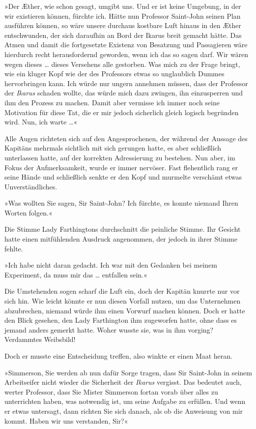 »Der Æther, wie schon gesagt, umgibt uns. Und er ist keine
Umgebung, in der wir existieren können, fürchte ich. Hätte nun
Professor Saint-John seinen Plan ausführen können, so wäre unsere
durchaus kostbare Luft hinaus in den Æther entschwunden, der sich
daraufhin an Bord der Ikarus breit gemacht hätte. Das Atmen und
damit die fortgesetzte Existenz von Besatzung und Passagieren wäre
hierdurch recht herausfordernd geworden, wenn ich das so sagen
darf. Wir wären wegen dieses \ldots{} dieses Versehens alle gestorben.
Was mich zu der Frage bringt, wie ein kluger Kopf wie der des
Professors etwas so unglaublich Dummes hervorbringen kann. Ich
würde nur ungern annehmen müssen, dass der Professor der
\emph{Ikarus} schaden wollte, das würde mich dazu zwingen, ihn
einzusperren und ihm den Prozess zu machen. Damit aber vermisse ich
immer noch seine Motivation für diese Tat, die er mir jedoch
sicherlich gleich logisch begründen wird. Nun, ich warte \ldots{}«

\bigpar

Alle Augen richteten sich auf den Angesprochenen, der während der
Aussage des Kapitäns mehrmals sichtlich mit sich gerungen hatte, es
aber schließlich unterlassen hatte, auf der korrekten Adressierung
zu bestehen. Nun aber, im Fokus der Aufmerksamkeit, wurde er immer
nervöser. Fast flehentlich rang er seine Hände und schließlich
senkte er den Kopf und murmelte verschämt etwas Unverständliches.

»Was wollten Sie sagen, Sir Saint-John? Ich fürchte, es konnte
niemand Ihren Worten folgen.«

Die Stimme Lady Farthingtons durchschnitt die peinliche Stimme. Ihr
Gesicht hatte einen mitfühlenden Ausdruck angenommen, der jedoch in
ihrer Stimme fehlte.

»Ich habe nicht daran gedacht. Ich war mit den Gedanken bei meinem
Experiment, da muss mir das \ldots{} entfallen sein.«

Die Umstehenden sogen scharf die Luft ein, doch der Kapitän knurrte
nur vor sich hin. Wie leicht könnte er nun diesen Vorfall nutzen,
um das Unternehmen abzubrechen, niemand würde ihm einen Vorwurf
machen können. Doch er hatte den Blick gesehen, den Lady
Farthington ihm zugeworfen hatte, ohne dass es jemand anders
gemerkt hatte. Woher wusste sie, was in ihm vorging? Verdammtes
Weibsbild!

Doch er musste eine Entscheidung treffen, also winkte er einen Maat
heran.

»Simmerson, Sie werden ab nun dafür Sorge tragen, dass Sir
Saint-John in seinem Arbeitseifer nicht wieder die Sicherheit der
\emph{Ikarus} vergisst. Das bedeutet auch, werter Professor, dass
Sie Mister Simmerson fortan vorab über alles zu unterrichten haben,
was notwendig ist, um seine Aufgabe zu erfüllen. Und wenn er etwas
untersagt, dann richten Sie sich danach, als ob die Anweisung von
mir kommt. Haben wir uns verstanden, Sir?«

